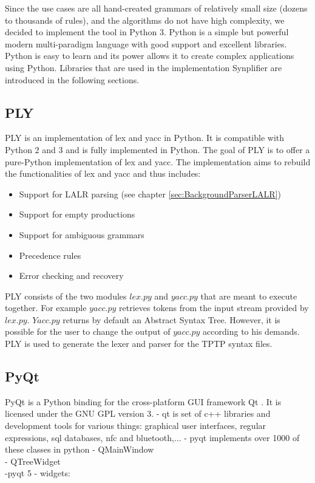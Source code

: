 Since the use cases are all hand-created grammars of relatively small size (dozens to thousands of rules), and the algorithms do not have high complexity, we decided to implement the tool in Python 3. 
Python is a simple but powerful modern multi-paradigm language with good support and excellent libraries.
Python is easy to learn and its power allows it to create complex applications using Python.
Libraries that are used in the implementation \ac{Synplifier} are introduced in the following sections.

\subsection{PLY}\label{sec:BackgroundPythonPLY}

\acf{PLY} is an implementation of lex and yacc in Python. It is compatible with Python 2 and 3 and is fully implemented in Python. The goal of \ac{PLY} is to offer a pure-Python implementation of lex and yacc. The implementation aims to rebuild the functionalities of lex and yacc and thus includes:
\begin{itemize}
\item Support for LALR parsing (see chapter \ref{sec:BackgroundParserLALR})
\item Support for empty productions
\item Support for ambiguous grammars 
\item Precedence rules
\item Error checking and recovery
\end{itemize}

\ac{PLY} consists of the two modules $lex.py$ and $yacc.py$ that are meant to execute together. For example $yacc.py$ retrieves tokens from the input stream provided by $lex.py$. $Yacc.py$ returns by default an Abstract Syntax Tree. However, it is possible for the user to change the output of $yacc.py$ according to his demands.
\cite{PLY}
PLY is used to generate the lexer and parser for the \ac{TPTP} syntax files.


\subsection{PyQt}\label{sec:BackgroundPytonPyQt}

PyQt is a Python binding for the cross-platform GUI framework Qt \cite{PyQt}.
It is licensed under the GNU GPL version 3.
- qt is set of c++ libraries and development tools for various things: graphical user interfaces, regular expressions, sql databases, nfc and bluetooth,...
- pyqt implements over 1000 of these classes in python
- QMainWindow \\
- QTreeWidget \\
-pyqt 5
- widgets:

